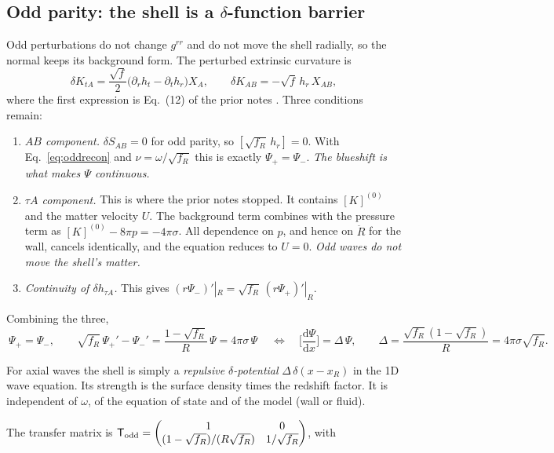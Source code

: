 \documentclass[11pt,a4paper]{article}
\numberwithin{equation}{section}
\newcommand{\sq}{\sqrt{f_R}}
\newcommand{\dd}{\mathrm{d}}
\begin{document}
\subsection{Odd parity: the shell is a $\delta$-function barrier}\label{sec:odd}
Odd perturbations do not change $g^{rr}$ and do not move the shell radially, so the normal keeps its background form.
The perturbed extrinsic curvature is
\begin{equation}
\delta K_{tA}=\frac{\sqrt f}{2}\big(\partial_rh_t-\partial_th_r\big)X_A,\qquad \delta K_{AB}=-\sqrt f\,h_r\,X_{AB},
\end{equation}
where the first expression is Eq.~(12) of the prior notes \cite{burbuja}. Three conditions remain:
\begin{enumerate}
\item \emph{$AB$ component.} $\delta S_{AB}=0$ for odd parity, so $[\sq\,h_r]=0$. With Eq.~\eqref{eq:oddrecon} and
$\nu=\omega/\sq$ this is exactly $\Psi_+=\Psi_-$. \emph{The blueshift is what makes $\Psi$ continuous.}
\item \emph{$\tau A$ component.} This is where the prior notes stopped. It contains $[K]^{(0)}$ and the matter velocity
$U$. The background term combines with the pressure term as $[K]^{(0)}-8\pi p=-4\pi\sigma$. All dependence on $p$, and
hence on $\ddot R$ for the wall, cancels identically, and the equation reduces to $U=0$. \emph{Odd waves do not move
the shell's matter.}
\item \emph{Continuity of $\delta h_{\tau A}$.} This gives $(r\Psi_-)'|_R=\sq\,(r\Psi_+)'|_R$.
\end{enumerate}
Combining the three,
\begin{equation}
\boxed{\ \Psi_+=\Psi_-,\qquad \sq\,\Psi_+'-\Psi_-'=\frac{1-\sq}{R}\,\Psi=4\pi\sigma\,\Psi\ }
\quad\Longleftrightarrow\quad\Big[\frac{\dd\Psi}{\dd x}\Big]=\Delta\,\Psi,\qquad \Delta=\frac{\sq(1-\sq)}{R}=4\pi\sigma\sq .
\label{eq:odd}
\end{equation}
\begin{keyidea}
For axial waves the shell is simply a \emph{repulsive $\delta$-potential} $\Delta\,\delta(x-x_R)$ in the 1D wave equation.
Its strength is the surface density times the redshift factor. It is independent of $\omega$, of the equation of state
and of the model (wall or fluid).
\end{keyidea}
The transfer matrix is $\mathsf T_{\rm odd}=\begin{pmatrix}1&0\\(1-\sq)/(R\sq)&1/\sq\end{pmatrix}$, with
\end{document}

